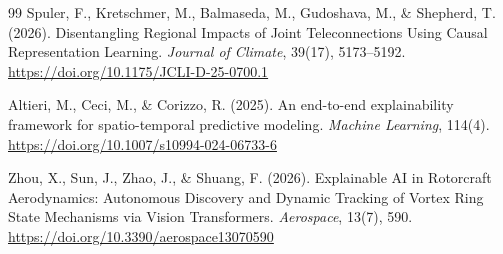 \begin{thebibliography}{99}
 Spuler, F., Kretschmer, M., Balmaseda, M., Gudoshava, M., \& Shepherd, T. (2026). Disentangling Regional Impacts of Joint Teleconnections Using Causal Representation Learning. \emph{Journal of Climate}, 39(17), 5173--5192. \url{https://doi.org/10.1175/JCLI-D-25-0700.1}

 Altieri, M., Ceci, M., \& Corizzo, R. (2025). An end-to-end explainability framework for spatio-temporal predictive modeling. \emph{Machine Learning}, 114(4). \url{https://doi.org/10.1007/s10994-024-06733-6}

 Zhou, X., Sun, J., Zhao, J., \& Shuang, F. (2026). Explainable AI in Rotorcraft Aerodynamics: Autonomous Discovery and Dynamic Tracking of Vortex Ring State Mechanisms via Vision Transformers. \emph{Aerospace}, 13(7), 590. \url{https://doi.org/10.3390/aerospace13070590}

\end{thebibliography}
